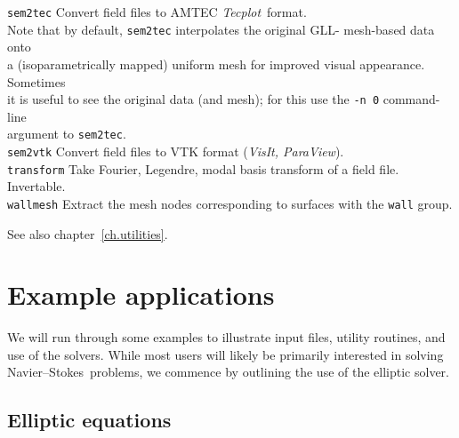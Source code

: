 \documentclass[11pt]{report}
\newcommand{\Tecplot}{\emph{Tecplot}}
\newcommand\NavSto{Navier--Stokes}
\begin{document}
\begin{tabbing}
\texttt{sem2tec} \>   
        Convert field files to AMTEC \Tecplot\ format.\\
        \> Note that by default, \verb|sem2tec| interpolates the original GLL-        mesh-based data onto \\
        \> a (isoparametrically mapped) uniform mesh for improved visual 
        appearance.  Sometimes\\ \>  it is useful to see the original data 
        (and mesh); for this use the \verb+-n 0+ command-line \\ 
         \> argument to \verb+sem2tec+.\\
\texttt{sem2vtk} \>   
        Convert field files to VTK format (\emph{VisIt, ParaView}).\\
\texttt{transform} \>      
        Take Fourier, Legendre, modal basis transform of a field
	file. Invertable.\\
\texttt{wallmesh} \>      
        Extract the mesh nodes corresponding to surfaces with the
	\verb+wall+ group.
\end{tabbing}
See also chapter~\ref{ch.utilities}.



\chapter{Example applications}
\label{ch.examples}

We will run through some examples to illustrate input files, utility
routines, and use of the solvers.  While most users will likely be
primarily interested in solving \NavSto\ problems, we commence by
outlining the use of the elliptic solver.

\section{Elliptic equations}
\label{sec.laplace}
\end{document}
